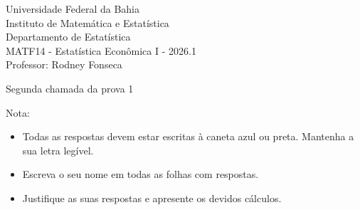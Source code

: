 \documentclass{article}
\date{--/--/----} %
\begin{document}
\begin{flushleft}
	Universidade Federal da Bahia\\
	Instituto de Matemática e Estatística\\
	Departamento de Estatística\\
	MATF14 - Estatística Econômica I - 2026.1\\
	Professor: Rodney Fonseca \\
\end{flushleft}

\begin{center}
	\begin{Large}
		Segunda chamada da prova 1 \\
	\end{Large}	
\end{center}

\hspace{2em} Nota: 

\vspace{1em}

\begin{flushleft}
\begin{small}

\begin{itemize}
	\item Todas as respostas devem estar escritas à caneta azul ou preta. Mantenha a sua letra legível.
	\item Escreva o seu nome em todas as folhas com respostas.
	\item Justifique as suas respostas e apresente os devidos cálculos.
\end{itemize}

\end{small}
\end{flushleft}

\vspace{1em}

\end{document}
